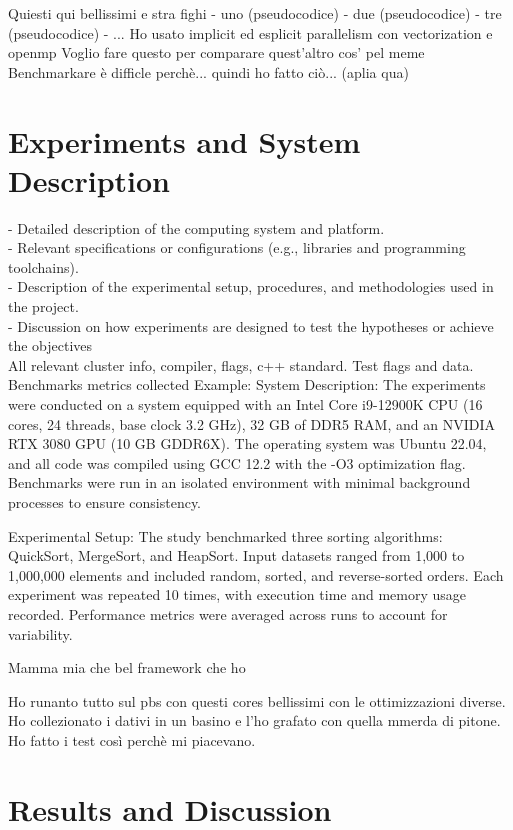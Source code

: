 \documentclass[conference]{IEEEtran}
\begin{document}
\fi

Quiesti qui bellissimi e stra fighi
- uno (pseudocodice)
- due (pseudocodice)
- tre (pseudocodice)
- ...
Ho usato implicit ed esplicit parallelism con vectorization e openmp
Voglio fare questo per comparare quest'altro cos' pel meme
Benchmarkare è difficle perchè... quindi ho fatto ciò... (aplia qua)


\section{Experiments and System Description}

- Detailed description of the computing system and platform. \\
- Relevant specifications or configurations (e.g., libraries
and programming toolchains). \\
- Description of the experimental setup, procedures, and
methodologies used in the project. \\
- Discussion on how experiments are designed to test the hypotheses
or achieve the objectives \\


All relevant cluster info, compiler, flags, c++ standard. Test flags and data. Benchmarks metrics collected
Example:
System Description:
The experiments were conducted on a system equipped with an Intel Core i9-12900K CPU (16 cores, 24 threads, base clock 3.2 GHz), 32 GB of DDR5 RAM, and an NVIDIA RTX 3080 GPU (10 GB GDDR6X). The operating system was Ubuntu 22.04, and all code was compiled using GCC 12.2 with the -O3 optimization flag. Benchmarks were run in an isolated environment with minimal background processes to ensure consistency.

Experimental Setup:
The study benchmarked three sorting algorithms: QuickSort, MergeSort, and HeapSort. Input datasets ranged from 1,000 to 1,000,000 elements and included random, sorted, and reverse-sorted orders. Each experiment was repeated 10 times, with execution time and memory usage recorded. Performance metrics were averaged across runs to account for variability.

Mamma mia che bel framework che ho

Ho runanto tutto sul pbs con questi cores bellissimi con le ottimizzazioni diverse. Ho collezionato i dativi in un basino e l'ho grafato con quella mmerda di pitone. Ho fatto i test così perchè mi piacevano.

\section{Results and Discussion}
\end{document}
